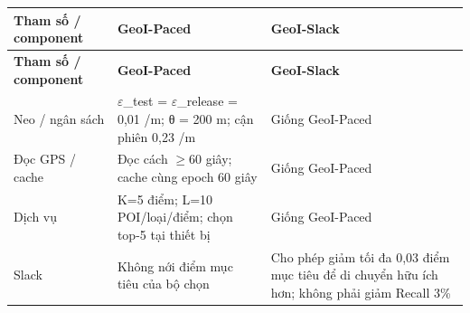 \begingroup\small
\begin{longtable}{@{}P{3.938cm}P{6.350cm}P{6.350cm}@{}}
\toprule
\textbf{Tham số / component} & \textbf{GeoI-Paced} & \textbf{GeoI-Slack}\\\midrule
\endfirsthead
\toprule
\textbf{Tham số / component} & \textbf{GeoI-Paced} & \textbf{GeoI-Slack}\\\midrule
\endhead
\bottomrule\endfoot
Neo / ngân sách & $\varepsilon$\_\allowbreak{}test = $\varepsilon$\_\allowbreak{}release = 0,01 /m; θ = 200 m; cận phiên 0,23 /m & Giống GeoI-Paced\\
\addlinespace[3pt]
Đọc GPS / cache & Đọc cách $\ge$60 giây; cache cùng epoch 60 giây & Giống GeoI-Paced\\
\addlinespace[3pt]
Dịch vụ & K=5 điểm; L=10 POI/loại/điểm; chọn top-5 tại thiết bị & Giống GeoI-Paced\\
\addlinespace[3pt]
Slack & Không nới điểm mục tiêu của bộ chọn & Cho phép giảm tối đa 0,03 điểm mục tiêu để di chuyển hữu ích hơn; không phải giảm Recall 3\%\\
\end{longtable}
\endgroup
{}

